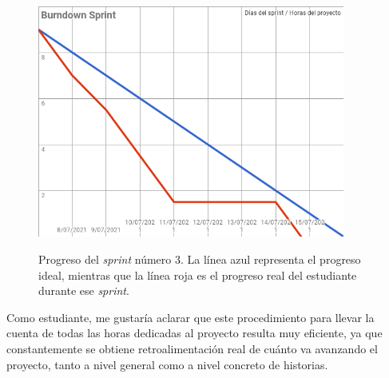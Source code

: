 \begin{figure}[h]
\centering
\includegraphics[width=0.9\textwidth]{logos/sprint4.png}\\[1.4cm]
\caption{Progreso del \textit{sprint} número 3. La línea azul representa el progreso ideal, mientras que la línea roja es el progreso real del estudiante durante ese \textit{sprint}.}
\label{img:sprint3}
\end{figure}

Como estudiante, me gustaría aclarar que este procedimiento para llevar la cuenta de todas las horas dedicadas al proyecto resulta muy eficiente, ya que constantemente se obtiene retroalimentación real de cuánto va avanzando el proyecto, tanto a nivel general como a nivel concreto de historias.